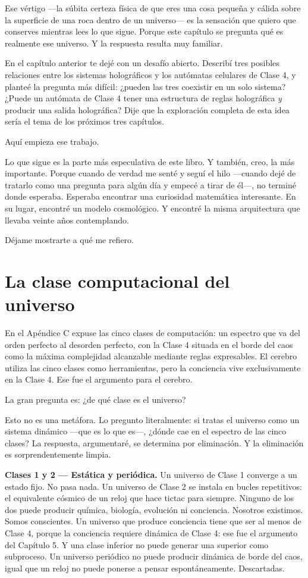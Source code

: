 \documentclass[11pt, twoside, openright]{book}
\begin{document}
Ese vértigo ---la súbita certeza física de que eres una cosa pequeña y cálida sobre la superficie de una roca dentro de un universo--- es la sensación que quiero que conserves mientras lees lo que sigue. Porque este capítulo se pregunta qué es realmente ese universo. Y la respuesta resulta muy familiar.


En el capítulo anterior te dejé con un desafío abierto. Describí tres posibles relaciones entre los sistemas holográficos y los autómatas celulares de Clase 4, y planteé la pregunta más difícil: ¿pueden las tres coexistir en un solo sistema? ¿Puede un autómata de Clase 4 tener una estructura de reglas holográfica \textit{y} producir una salida holográfica? Dije que la exploración completa de esta idea sería el tema de los próximos tres capítulos.

Aquí empieza ese trabajo.

Lo que sigue es la parte más especulativa de este libro. Y también, creo, la más importante. Porque cuando de verdad me senté y seguí el hilo ---cuando dejé de tratarlo como una pregunta para algún día y empecé a tirar de él---, no terminé donde esperaba. Esperaba encontrar una curiosidad matemática interesante. En su lugar, encontré un modelo cosmológico. Y encontré la misma arquitectura que llevaba veinte años contemplando.

Déjame mostrarte a qué me refiero.


\section*{La clase computacional del universo}

En el Apéndice C expuse las cinco clases de computación: un espectro que va del orden perfecto al desorden perfecto, con la Clase 4 situada en el borde del caos como la máxima complejidad alcanzable mediante reglas expresables. El cerebro utiliza las cinco clases como herramientas, pero la conciencia vive exclusivamente en la Clase 4. Ese fue el argumento para el cerebro.

La gran pregunta es: ¿de qué clase es el universo?

Esto no es una metáfora. Lo pregunto literalmente: si tratas el universo como un sistema dinámico ---que es lo que es---, ¿dónde cae en el espectro de las cinco clases? La respuesta, argumentaré, se determina por eliminación. Y la eliminación es sorprendentemente limpia.

\textbf{Clases 1 y 2 --- Estática y periódica.} Un universo de Clase 1 converge a un estado fijo. No pasa nada. Un universo de Clase 2 se instala en bucles repetitivos: el equivalente cósmico de un reloj que hace tictac para siempre. Ninguno de los dos puede producir química, biología, evolución ni conciencia. Nosotros existimos. Somos conscientes. Un universo que produce conciencia tiene que ser al menos de Clase 4, porque la conciencia requiere dinámica de Clase 4: ese fue el argumento del Capítulo 5. Y una clase inferior no puede generar una superior como subproceso. Un universo periódico no puede producir dinámica de borde del caos, igual que un reloj no puede ponerse a pensar espontáneamente. Descartadas.
\end{document}
